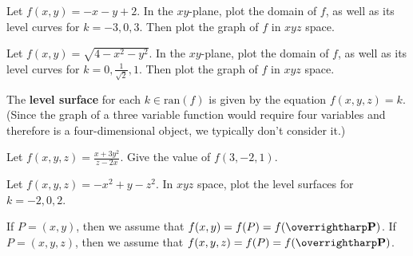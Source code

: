 \documentclass[letterpaper, twoside, 12pt]{book}
\begin{document}
          \begin{problem}
            Let $f(x,y)=-x-y+2$. In the $xy$-plane, plot the domain of $f$,
            as well as its level curves for $k=-3,0,3$. Then plot the graph
            of $f$ in $xyz$ space.
          \end{problem}

          \begin{solution}

          \end{solution}

          \begin{problem}
            Let $f(x,y)=\sqrt{4-x^2-y^2}$. In the $xy$-plane,
            plot the domain of $f$,
            as well as its level curves for $k=0,\frac{1}{\sqrt{2}},1$.
            Then plot the graph of $f$ in $xyz$ space.
          \end{problem}

          \begin{solution}

          \end{solution}

\begin{definition}
  The \textbf{level surface} for each $k\in\text{ran}(f)$ is given by the
  equation $f(x,y,z)=k$.
  (Since the graph of a three variable function would require four
  variables and therefore is a four-dimensional object, we typically
  don't consider it.)
\end{definition}

          \begin{problem}
            Let $f(x,y,z)=\frac{x+3y^2}{z-2x}$. Give the value of $f(3,-2,1)$.
          \end{problem}

          \begin{solution}

          \end{solution}

          \begin{problem}
            Let $f(x,y,z)=-x^2+y-z^2$. In $xyz$ space, plot the level
            surfaces for $k=-2,0,2$.
          \end{problem}

          \begin{solution}

          \end{solution}

\begin{remark}
  If $P=(x,y)$, then we assume that $f(x,y)=f(P)=f(\vect{P})$.
  If $P=(x,y,z)$, then we assume that $f(x,y,z)=f(P)=f(\vect{P})$.
\end{remark}
\end{document}
